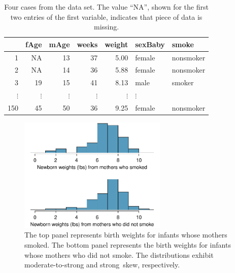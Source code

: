 \begin{table}[h]
\centering
\begin{tabular}{rrrrrll}
  \hline
 & fAge & mAge & weeks & weight & sexBaby & smoke \\ 
  \hline
1 & NA & 13 &  37 & 5.00 & female & nonsmoker \\ 
  2 & NA & 14 &  36 & 5.88 & female & nonsmoker \\ 
  3 & 19 & 15 &  41 & 8.13 & male & smoker \\ 
  $\vdots$ &   $\vdots$ &   $\vdots$ &   $\vdots$ &   $\vdots$ &   $\vdots$ \\
  150 & 45 & 50 &  36 & 9.25 & female & nonsmoker \\ 
   \hline
\end{tabular}
\caption{Four cases from the  data set. The value ``NA'', shown for the first two entries of the first variable, indicates that piece of data is missing.\textC{-2mm}}
\label{babySmokeDF}
\end{table}

\begin{figure}[hhh]
\centering
\includegraphics[width=0.63\textwidth]{ch_inference_for_means_oi_biostat/figures/babySmokePlotOfTwoGroupsToExamineSkew/babySmokePlotOfTwoGroupsToExamineSkew}
\caption{The top panel represents birth weights for infants whose mothers smoked. The bottom panel represents the birth weights for infants whose mothers who did not smoke. The distributions exhibit moderate-to-strong and strong~skew, respectively.}
\label{babySmokePlotOfTwoGroupsToExamineSkew}
\end{figure}

